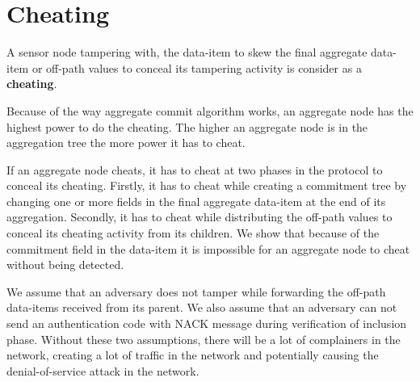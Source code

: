 \chapter{Cheating}
	
	\begin{definition}
		A sensor node tampering with, the data-item to skew the final aggregate data-item or  off-path values to conceal its tampering activity is consider as a \textbf{cheating}.	
	\end{definition}
	Because of the way aggregate commit algorithm works, an aggregate node has the highest power to do the cheating. 
	The higher an aggregate node is in the aggregation tree the more power it has to cheat.
	
	If an aggregate node cheats, it has to cheat at two phases in the protocol to conceal its cheating.
	Firstly, it has to cheat while creating a commitment tree by changing one or more fields in the final aggregate data-item at the end of its aggregation.
	Secondly, it has to cheat while distributing the off-path values to conceal its cheating activity from its children.
	We show that because of the commitment field in the data-item it is impossible for an aggregate node to cheat without being detected.

	We assume that an adversary does not tamper while forwarding the off-path data-items received from its parent.
	We also assume that an adversary can not send an authentication code with NACK message during verification of inclusion phase.
	Without these two assumptions, there will be a lot of complainers in the network, creating a lot of traffic in the network and potentially causing the denial-of-service attack in the network.

